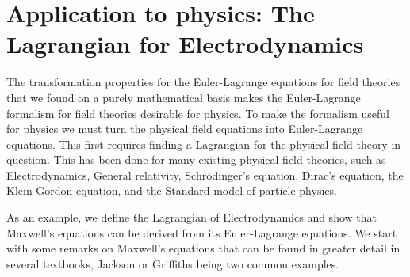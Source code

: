 \documentclass[prb,preprint]{revtex4-1}
\begin{document}
\section{Application to physics: The Lagrangian for Electrodynamics}
The transformation properties for the Euler-Lagrange equations for field theories that we found on a purely mathematical basis makes the Euler-Lagrange formalism for field theories desirable for physics.
To make the formalism useful for physics we must turn the physical field equations into Euler-Lagrange equations.
This first requires finding a Lagrangian for the physical field theory in question.
This has been done for many existing physical field theories, such as Electrodynamics, General relativity, Schr\"odinger's equation, Dirac's equation, the Klein-Gordon equation, and the Standard model of particle physics.

As an example, we define the Lagrangian of Electrodynamics and show that Maxwell's equations can be derived from its Euler-Lagrange equations.
We start with some remarks on Maxwell's equations that can be found in greater detail in several textbooks, Jackson\cite{jackson1999classical} or Griffiths\cite{griffiths2017introduction} being two common examples.
\end{document}
